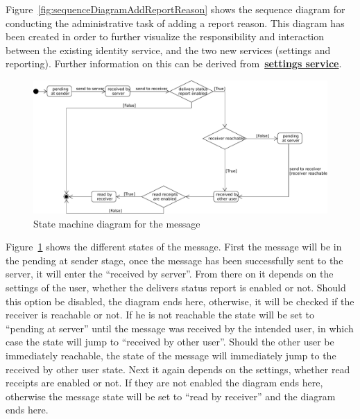 Figure~\ref{fig:sequenceDiagramAddReportReason} shows the sequence diagram for conducting the administrative task of
adding a report reason.
This diagram has been created in order to further visualize the responsibility and interaction between the existing
identity service, and the two new services (settings and reporting).
Further information on this can be derived from~\hyperref[subsubsec:settingsSer]{\textbf{settings service}}.

\begin{figure}[h]
    \centering
    \includegraphics[width=1.0\textwidth]{./graphics/stateMachineMessage}
    \caption{State machine diagram for the message}
    \label{fig:stateMachineMessage}
\end{figure}

Figure~\ref{fig:stateMachineMessage} shows the different states of the message.
First the message will be in the pending at sender stage, once the message has been successfully sent to the server,
it will enter the \enquote{received by server}.
From there on it depends on the settings of the user, whether the delivers status report is enabled or not.
Should this option be disabled, the diagram ends here, otherwise, it will be checked if the receiver is reachable or
not.
If he is not reachable the state will be set to \enquote{pending at server} until the message was received by the intended
user, in which case the state will jump to \enquote{received by other user}.
Should the other user be immediately reachable, the state of the message will immediately jump to the received by other
user state.
Next it again depends on the settings, whether read receipts are enabled or not.
If they are not enabled the diagram ends here, otherwise the message state will be set to \enquote{read by receiver}
and the diagram ends here.

